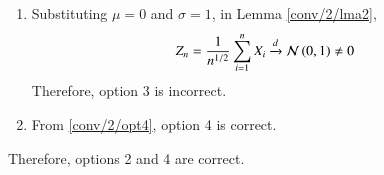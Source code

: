 \begin{enumerate}
\begin{proof}
\begin{align}
    \mean{Y_n} &= \dfrac{1}{n^{3/4}}\mean{\brak{\sum_{i=1}^n X_i}} = 0
\end{align}
Since $E(X_i) = 0$. Also, from Lemma \ref{conv/2/varsum},
\begin{align}
    \var{Y_n} &= \dfrac{1}{n^{3/2}} \brak{\sum_{i=1}^n\mean{ X_i}}
    \\
    &= \dfrac{1}{n^{3/2}} \times n = \dfrac{1}{n^{1/2}}
\end{align}
  $\because \var{X_i}=1$. 
\end{proof}
Now, from Lemma \ref{conv/2/lma4} and Lemma \ref{conv/2/result2}
\begin{align}
    \lim_{n \to \infty}\pr{|Y_n-0|\geq \epsilon} &\leq \lim_{n \to \infty }\dfrac{1}{n^{1/2}\epsilon^2}\\
    &= 0
\end{align}
From Definition \ref{conv/2/def2},
\begin{align}
    \dfrac{1}{n^{3/4}}\sum_{i=1}^n X_i \xrightarrow[]{p} 0
\end{align}
Thus, option 2 is correct.
\item Substituting $\mu=0$ and $\sigma=1$, in  Lemma \ref{conv/2/lma2},
\begin{align}
    Z_n &= \dfrac{1}{n^{1/2}} \sum_{i=1}^n X_i  \xrightarrow[]{d} \mathcal{N}\left({0}, {1} \right) \ne 0
\end{align}
Therefore, option 3 is incorrect.
\item From \eqref{conv/2/opt4}, option 4 is correct.
\end{enumerate}
Therefore, options 2 and 4 are correct.